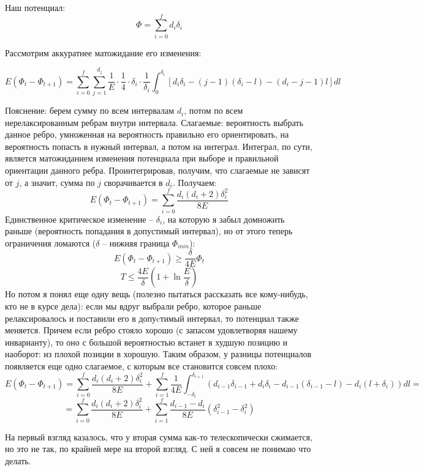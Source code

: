 \documentclass[a4paper]{article}
\begin{document}
 Наш потенциал:
 $$\Phi = \sum_{i = 0}^f d_i \delta_i$$
 
 Рассмотрим аккуратнее матожидание его изменения:
 
 $$E(\Phi_t - \Phi_{t + 1}) = \sum_{i = 0}^f \sum_{j = 1}^{d_j} \frac{1}{E} \cdot \frac{1}{4} \cdot \delta_i \cdot \frac{1}{\delta_i} \int_0^{\delta_i} \left[ d_i\delta_i-(j - 1)(\delta_i - l) - (d_i - j - 1)l\right]dl$$
 
 Пояснение: берем сумму по всем интервалам $d_i$, потом по всем нерелаксированным ребрам внутри интервала. Слагаемые: вероятность выбрать данное ребро, умноженная на вероятность правильно его ориентировать, на вероятность попасть в нужный интервал, а потом на интеграл. Интеграл, по сути, является матожиданием изменения потенциала при выборе и правильной ориентации данного ребра.
 Проинтегрировав, получим, что слагаемые не зависят от $j$, а значит, сумма по $j$ сворачивается в $d_i$. Получаем:
 $$E(\Phi_t - \Phi_{t + 1}) = \sum_{i = 0}^f \frac{d_i(d_i + 2)\delta_i^2}{8E}$$
 Единственное критическое изменение -- $\delta_i$, на которую я забыл домножить раньше (вероятность попадания в допустимый интервал), но от этого теперь ограничения ломаются ($\delta$ -- нижняя граница $\Phi_{min}$):
 $$E(\Phi_t - \Phi_{t + 1}) \ge \frac{\delta}{4E} \Phi_t$$ 
 $$ T \le \frac{4E}{\delta} \left(1 + \ln\frac{E}{\delta}\right)$$
 Но потом я понял еще одну вещь (полезно пытаться рассказать все кому-нибудь, кто не в курсе дела): если мы вдруг выбрали ребро, которое раньше релаксировалось и поставили его в допуcтимый интервал, то потенциал также меняется. Причем если ребро стояло хорошо (с запасом удовлетворяя нашему инварианту), то оно с большой вероятностью встанет в худшую позицию и наоборот: из плохой позиции в хорошую. Таким образом, у разницы потенциалов появляется еще одно слагаемое, с которым все становится совсем плохо:
 $$E(\Phi_t - \Phi_{t + 1}) = \sum_{i = 0}^f \frac{d_i(d_i + 2)\delta_i^2}{8E} + \sum_{i = 1}^f \frac{1}{4E} \int_{-\delta_i}^{\delta_{i + 1}} (d_{i - 1} \delta_{i - 1} + d_i \delta_i - d_{i-1}(\delta_{i - 1} - l) - d_i(l + \delta_i)) dl = $$
 $$ = \sum_{i = 0}^f \frac{d_i(d_i + 2)\delta_i^2}{8E} + \sum_{i = 1}^f \frac{d_{i - 1} - d_i}{8E}(\delta_{i - 1}^2 - \delta_i^2)$$
 
На первый взгляд казалось, что у вторая сумма как-то телескопически сжимается, но это не так, по крайней мере на второй взгляд. С ней я совсем не понимаю что делать.
 
 
\end{document}
